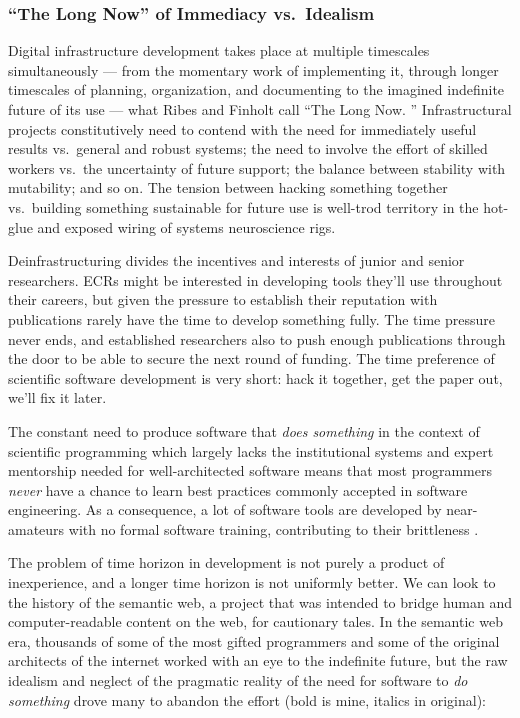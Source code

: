 \documentclass[10pt]{article}
\begin{document}
\begin{multicols}{2}
\hypertarget{the-long-now-of-immediacy-vs.-idealism}{%
\subsubsection{``The Long Now'' of Immediacy
vs.~Idealism}\label{the-long-now-of-immediacy-vs.-idealism}}

Digital infrastructure development takes place at multiple timescales
simultaneously --- from the momentary work of implementing it, through
longer timescales of planning, organization, and documenting to the
imagined indefinite future of its use --- what Ribes and Finholt call
``The Long Now. \cite{ribesLongNowTechnology2009} ''
Infrastructural projects constitutively need to contend with the need
for immediately useful results vs.~general and robust systems; the need
to involve the effort of skilled workers vs.~the uncertainty of future
support; the balance between stability with mutability; and so on. The
tension between hacking something together vs.~building something
sustainable for future use is well-trod territory in the hot-glue and
exposed wiring of systems neuroscience rigs.

Deinfrastructuring divides the incentives and interests of junior and
senior researchers. ECRs might be interested in developing tools they'll
use throughout their careers, but given the pressure to establish their
reputation with publications rarely have the time to develop something
fully. The time pressure never ends, and established researchers also to
push enough publications through the door to be able to secure the next
round of funding. The time preference of scientific software development
is very short: hack it together, get the paper out, we'll fix it later.

The constant need to produce software that \emph{does something} in the
context of scientific programming which largely lacks the institutional
systems and expert mentorship needed for well-architected software means
that most programmers \emph{never} have a chance to learn best practices
commonly accepted in software engineering. As a consequence, a lot of
software tools are developed by near-amateurs with no formal software
training, contributing to their brittleness \cite{altschulAnatomySuccessfulComputational2013} .

The problem of time horizon in development is not purely a product of
inexperience, and a longer time horizon is not uniformly better. We can
look to the history of the semantic web, a project that was intended to
bridge human and computer-readable content on the web, for cautionary
tales. In the semantic web era, thousands of some of the most gifted
programmers and some of the original architects of the internet worked
with an eye to the indefinite future, but the raw idealism and neglect
of the pragmatic reality of the need for software to \emph{do something}
drove many to abandon the effort (bold is mine, italics in original):


\end{multicols}
\end{document}
